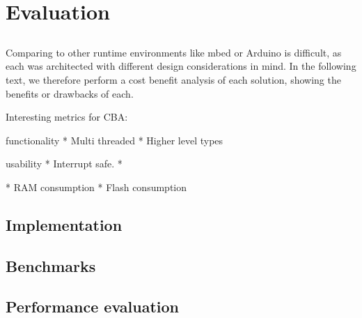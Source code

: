 \section{Evaluation}
\label{sec:evaluate}

\subsection{\CO}

Comparing \CO to other runtime environments like mbed or Arduino is difficult, as each was architected with different design considerations in mind. In the following text, we therefore perform a cost benefit analysis of each solution, showing the benefits or drawbacks of each.

Interesting metrics for CBA:

functionality
* Multi threaded
* Higher level types


usability
* Interrupt safe.
*


* RAM consumption
* Flash consumption



\subsection{Implementation}


\subsection{Benchmarks}

\subsection{Performance evaluation}

